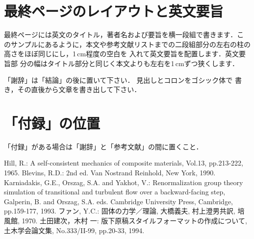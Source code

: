\documentclass[nosetpagesize]{jsce}
\begin{document}
\lastpagecontrol[1cm]{13cm}

\section{最終ページのレイアウトと英文要旨}

最終ページには英文のタイトル，著者名および要旨を横一段組で書きます．こ
のサンプルにあるように，本文や参考文献リストまでの二段組部分の左右の柱の
高さをほぼ同じにし，1\,cm程度の空白を
入れて英文要旨を配置します．英文要旨部
分の幅はタイトル部分と同じく本文よりも左右を1\,cmずつ狭くします．

\ack 「謝辞」は「結論」の後に置いて下さい．
見出しとコロンをゴシック体で
書き，その直後から文章を書き出して下さい．

\appendix

\section{「付録」の位置}

「付録」がある場合は「謝辞」と「参考文献」の間に置くこと．

\begin{thebibliography}{20}
 Hill, R.: A self-consistent mechanics of composite materials,
  Vol.13, pp.213-222, 1965.
 Blevins, R.D.:
  2nd ed.
 Van Nostrand Reinhold, New York, 1990.
 Karniadakis, G.E., Orszag, S.A. and Yakhot, V.:
 Renormalization group theory simulation of
 transitional and turbulent flow over a backward-facing step,
  Galperin, B. and Orszag, S.A. eds.
 Cambridge University Press, Cambridge, pp.159-177, 1993.
 ファン, Y.C.:
 \newblock 固体の力学／理論,
 \newblock 大橋義夫, 村上澄男共訳, 培風館, 1970.
 土田建次，木村 一:
 \newblock 版下原稿スタイルフォーマットの作成について,
 \newblock 土木学会論文集, No.333/II-99, pp.20-33, 1994.
\end{thebibliography}

\lastpagesettings
\end{document}
